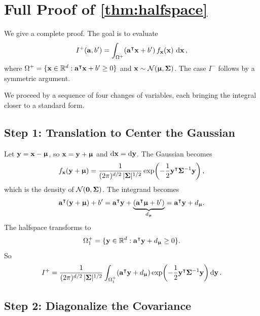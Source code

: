 \documentclass[11pt, letterpaper]{article}
\newcommand{\bSigma}{\vb{\Sigma}}
\newcommand{\bmu}{\boldsymbol{\upmu}}
\newcommand{\R}{\mathbb{R}}
\newcommand{\Norm}{\mathcal{N}}
\begin{document}
\section{Full Proof of \cref{thm:halfspace}}\label{app:proof}

We give a complete proof. The goal is to evaluate
\begin{equation}
    I^+(\vb{a}, b') = \int_{\Omega^+}(\vb{a}^{\intercal}\vb{x} + b')\, f_{\vb{x}}(\vb{x})\,\dd{\vb{x}},
\end{equation}
where $\Omega^+ = \{\vb{x} \in \R^d : \vb{a}^{\intercal}\vb{x} + b' \geq 0\}$ and $\vb{x} \sim \Norm(\bmu, \bSigma)$. The case $I^-$ follows by a symmetric argument.

We proceed by a sequence of four changes of variables, each bringing the integral closer to a standard form.

\subsection{Step 1: Translation to Center the Gaussian}

Let $\vb{y} = \vb{x} - \bmu$, so $\vb{x} = \vb{y} + \bmu$ and $\dd{\vb{x}} = \dd{\vb{y}}$. The Gaussian becomes
\begin{equation}
    f_{\vb{x}}(\vb{y} + \bmu) = \frac{1}{(2\pi)^{d/2}\, |\bSigma|^{1/2}} \exp\!\left(-\frac{1}{2}\vb{y}^{\intercal}\bSigma^{-1}\vb{y}\right),
\end{equation}
which is the density of $\Norm(\vb{0}, \bSigma)$. The integrand becomes
\begin{equation}
    \vb{a}^{\intercal}(\vb{y} + \bmu) + b' = \vb{a}^{\intercal}\vb{y} + \underbrace{(\vb{a}^{\intercal}\bmu + b')}_{d_{\bmu}} = \vb{a}^{\intercal}\vb{y} + d_{\bmu}.
\end{equation}
The halfspace transforms to
\begin{equation}
    \Omega^+_1 = \{\vb{y} \in \R^d : \vb{a}^{\intercal}\vb{y} + d_{\bmu} \geq 0\}.
\end{equation}
So
\begin{equation}
    I^+ = \frac{1}{(2\pi)^{d/2}\, |\bSigma|^{1/2}} \int_{\Omega^+_1} (\vb{a}^{\intercal}\vb{y} + d_{\bmu}) \exp\!\left(-\frac{1}{2}\vb{y}^{\intercal}\bSigma^{-1}\vb{y}\right) \dd{\vb{y}}.
\end{equation}

\subsection{Step 2: Diagonalize the Covariance}
\end{document}
